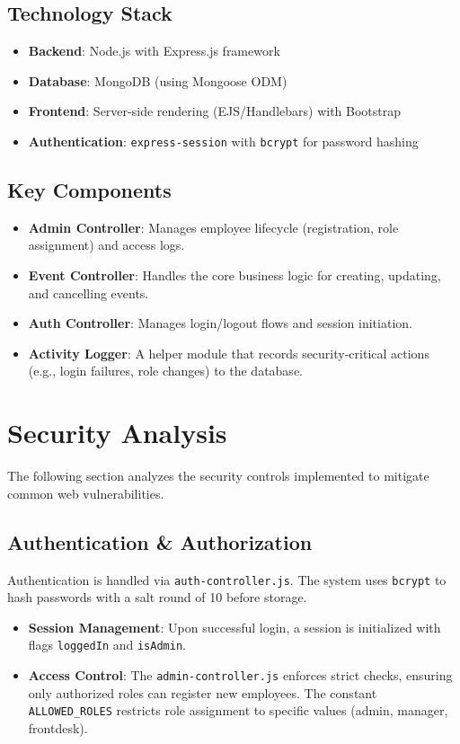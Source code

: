\documentclass[11pt]{article}
\begin{document}
\subsection{Technology Stack}
\begin{itemize}
    \item \textbf{Backend}: Node.js with Express.js framework
    \item \textbf{Database}: MongoDB (using Mongoose ODM)
    \item \textbf{Frontend}: Server-side rendering (EJS/Handlebars) with Bootstrap
    \item \textbf{Authentication}: \texttt{express-session} with \texttt{bcrypt} for password hashing
\end{itemize}

\subsection{Key Components}
\begin{itemize}
    \item \textbf{Admin Controller}: Manages employee lifecycle (registration, role assignment) and access logs.
    \item \textbf{Event Controller}: Handles the core business logic for creating, updating, and cancelling events.
    \item \textbf{Auth Controller}: Manages login/logout flows and session initiation.
    \item \textbf{Activity Logger}: A helper module that records security-critical actions (e.g., login failures, role changes) to the database.
\end{itemize}

\section{Security Analysis}
The following section analyzes the security controls implemented to mitigate common web vulnerabilities.

\subsection{\texorpdfstring{Authentication \& Authorization}{Authentication and Authorization}}
Authentication is handled via \texttt{auth-controller.js}. The system uses \texttt{bcrypt} to hash passwords with a salt round of 10 before storage.
\begin{itemize}
    \item \textbf{Session Management}: Upon successful login, a session is initialized with flags \texttt{loggedIn} and \texttt{isAdmin}.
    \item \textbf{Access Control}: The \texttt{admin-controller.js} enforces strict checks, ensuring only authorized roles can register new employees. The constant \texttt{ALLOWED\_ROLES} restricts role assignment to specific values (admin, manager, frontdesk).
\end{itemize}
\end{document}
